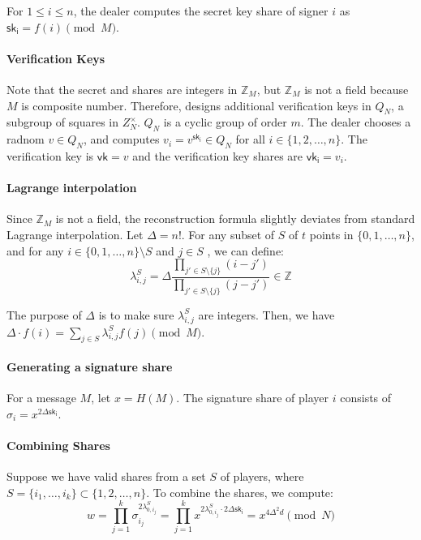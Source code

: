 \par For $1\le i \le n$, the dealer computes the secret key share of signer $i$ as $\mathsf{sk_i} = f(i)\pmod M$. 

\paragraph{Verification Keys} Note that the secret and shares are integers in $\mathbb{Z}_M$, but $\mathbb{Z}_M$ is not a field because $M$ is composite number. Therefore, \cite{DBLP:conf/eurocrypt/Shoup00} designs additional verification keys in $Q_N$, a subgroup of squares in $Z_N^\times$. $Q_N$ is a cyclic group of order $m$. The dealer chooses a radnom $v\in Q_N$, and computes $v_i=v^{\mathsf{sk_i}}\in Q_N$ for all $i\in \{1, 2, \dots, n\}$. The verification key is $\mathsf{vk}=v$ and the verification key shares are $\mathsf{vk_i}=v_i$. 

\paragraph{Lagrange interpolation} Since $\mathbb{Z}_M$ is not a field, the reconstruction formula slightly deviates from standard Lagrange interpolation. Let $\Delta=n!$. For any subset of $S$ of $t$ points in $\{0,1,\dots, n\}$, and for any $i\in\{0,1,\dots, n\}\setminus S$ and $j\in S$ , we can define: 
\begin{equation*}
    \lambda_{i,j}^S = \Delta \frac{\prod_{j'\in S\setminus\{j\}} (i-j')}{\prod_{j'\in S\setminus \{j\}} (j-j')}\in \mathbb{Z}
\end{equation*} 

The purpose of $\Delta$ is to make sure $\lambda_{i, j}^S$ are integers. Then, we have $\Delta\cdot f(i) = \sum_{j\in S} \lambda_{i,j}^S f(j)\pmod{M}$. 

\paragraph{Generating a signature share} For a message $M$, let $x=H(M)$. The signature share of player $i$ consists of $\sigma_i = x^{2 \Delta \mathsf{sk_i}}$. 

\paragraph{Combining Shares} Suppose we have valid shares from a set $S$ of players, where $S=\{i_1, \dots, i_k\}\subset \{1, 2, \dots, n\}$. To combine the shares, we compute: 
\begin{equation*}
    w=\prod_{j=1}^k \sigma_{i_j}^{2\lambda_{0, i_j}^S} = \prod_{j=1}^k x^{2\lambda_{0, i_j}^S \cdot 2\Delta \mathsf{sk_i}} =x^{4\Delta^2 d}\pmod {N}
\end{equation*} 

